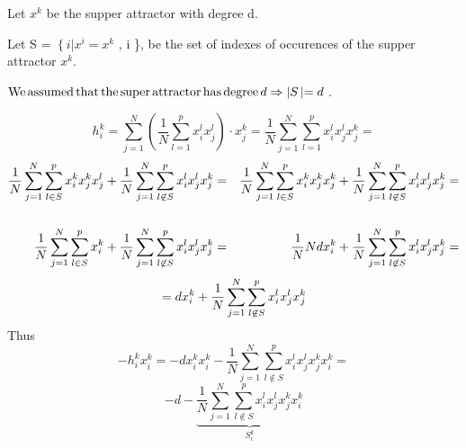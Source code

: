 Let $x^k_{}$ be the supper attractor with degree d.

Let S = $\left\{ i \left|  \right. \right. x^i_{} = x^k$ , i {}\}, be the set of indexes of occurences of the
supper attractor $x^k_{}$.

$\operatorname{We} \operatorname{assumed} \operatorname{that} \operatorname{the} \operatorname{super} \operatorname{attractor}
\operatorname{has} \operatorname{degree} d    \Rightarrow \left| S
\left| = d  \right. \right.$.


\[ h_i^k = \sum^N_{j = 1} \left(^{} \frac{1}{N} \sum^p_{l = 1} x^l_{i^{}}
   x^l_j \right)_{} \cdot x_j^k = \frac{1}{N}  \sum^N_{j = 1} \sum^p_{l = 1}
   x^l_{i^{}} x^l_j x^k_{^{} j} = \]
\begin{eqnarray*}
  \frac{1}{N}  \sum^N_{j = 1} \sum_{l \in S}^p x^k_{i} x^k_j x^l_{j}   + \frac{1}{N}  \sum^N_{j = 1} \sum^p_{l \not\in S}
  x^l_{i} x^l_j x^k_{j}  & = &  \frac{1}{N}  \sum^N_{j = 1} \sum_{l
  \in S}^p x^k_{i} x^k_j x^k_{j}   + \frac{1}{N}
  \sum^N_{j = 1} \sum^p_{l \not\in S} x^l_{i} x^l_j x^k_{j} =\\
  &  & \\
  \frac{1}{N}  \sum^N_{j = 1} \sum_{l \in S}^p x^k_{i}  + 
  \frac{1}{N}  \sum^N_{j = 1} \sum^p_{l \not\in S} x^l_{i} x^l_j x^k_{j}
  & = &  \frac{1}{N} N d x^k_{i}  + \frac{1}{N}  \sum^N_{j =
  1} \sum^p_{l \not\in S} x^l_{i} x^l_j x^k_{j} =
\end{eqnarray*}
\[ = d x^k_{i^{}}  + \frac{1}{N}  \sum^N_{j = 1} \sum^p_{l \not\in S}
   x^l_{i^{}} x^l_j x^k_{^{} j} \]
Thus
\[ - h^k_i x^k_i = - d x_i^k x_i^k - \frac{1}{N}  \sum^N_{j = 1} \sum^p_{l
   \nin S} x^l_{i^{}} x^l_j x^k_{^{} j} x^k_{i^{}} = \]
\[ - d - \underbrace{ \frac{1}{N}  \sum^N_{j = 1} \sum^p_{l \nin S} x^l_{i^{}}
   x^l_j x^k_{^{} j} x^k_{i^{}} }_{S^k_i} \]
\ \ \ \ \ \ \ \ \ \ \ \ \ \ \ \ \ \ \ \ \ \ \ \ \ \ \ \ \ \ \ \ \ \ \ \ \ \ \
\ \ \ \ \ \ \ \ \ \ \ \ \ \ \ \ \ \ \ \ \ \ \

